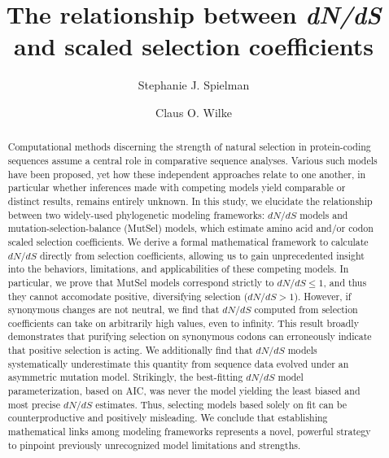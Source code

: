 \documentclass{pnastwo}
\begin{document}
	
	
\title{The relationship between \emph{\textbf{dN/dS}} and scaled selection coefficients}
	
\author{Stephanie J. Spielman 
	\and
	Claus O. Wilke
}
	
\maketitle

\begin{article}


\begin{abstract}
Computational methods discerning the strength of natural selection in protein-coding sequences assume a central role in comparative sequence analyses. Various such models have been proposed, yet how these independent approaches relate to one another, in particular whether inferences made with competing models yield comparable or distinct results, remains entirely unknown. In this study, we elucidate the relationship between two widely-used phylogenetic modeling frameworks: $dN/dS$ models and mutation-selection-balance (MutSel) models, which estimate amino acid and/or codon scaled selection coefficients. We derive a formal mathematical framework to calculate $dN/dS$ directly from selection coefficients, allowing us to gain unprecedented insight into the behaviors, limitations, and applicabilities of these competing models. In particular, we prove that MutSel models correspond strictly to $dN/dS \leq 1$, and thus they cannot accomodate positive, diversifying selection ($dN/dS > 1$). However, if synonymous changes are not neutral, we find that $dN/dS$ computed from selection coefficients can take on arbitrarily high values, even to infinity. This result broadly demonstrates that purifying selection on synonymous codons can erroneously indicate that positive selection is acting. We additionally find that $dN/dS$ models systematically underestimate this quantity from sequence data evolved under an asymmetric mutation model. Strikingly, the best-fitting $dN/dS$ model parameterization, based on AIC, was never the model yielding the least biased and most precise $dN/dS$ estimates. Thus, selecting models based solely on fit can be counterproductive and positively misleading. We conclude that establishing mathematical links among modeling frameworks represents a novel, powerful strategy to pinpoint previously unrecognized model limitations and strengths. %
\end{abstract}


\end{article}
\end{document}
